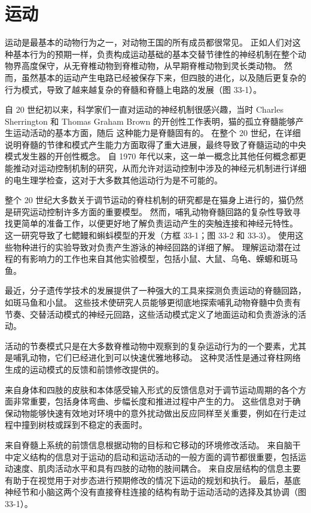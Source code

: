 \chapter{运动} \label{chap:chap33}

运动是最基本的动物行为之一，对动物王国的所有成员都很常见。 正如人们对这种基本行为的预期一样，负责构成运动基础的基本交替节律性的神经机制在整个动物界高度保守，从无脊椎动物到脊椎动物，从早期脊椎动物到灵长类动物。 然而，虽然基本的运动产生电路已经被保存下来，但四肢的进化，以及随后更复杂的行为模式，导致了越来越复杂的脊髓和脊髓上电路的发展（图 33-1）。

自 20 世纪初以来，科学家们一直对运动的神经机制很感兴趣，当时 Charles Sherrington 和 Thomas Graham Brown 的开创性工作表明，猫的孤立脊髓能够产生运动活动的基本方面，随后 这种能力是脊髓固有的。 在整个 20 世纪，在详细说明脊髓的节律和模式产生能力方面取得了重大进展，最终导致了脊髓运动的中央模式发生器的开创性概念。 自 1970 年代以来，这一单一概念比其他任何概念都更能推动对运动控制机制的研究，从而允许对运动控制中涉及的神经元机制进行详细的电生理学检查，这对于大多数其他运动行为是不可能的。

整个 20 世纪大多数关于调节运动的脊柱机制的研究都是在猫身上进行的，猫仍然是研究运动控制许多方面的重要模型。 然而，哺乳动物脊髓回路的复杂性导致寻找更简单的准备工作，以便更好地了解负责运动产生的突触连接和神经元特性。 这一研究导致了七鳃鳗和蝌蚪模型的开发（方框 33-1；图 33-2 和 33-3）。 使用这些物种进行的实验导致对负责产生游泳的神经回路的详细了解。 理解运动潜在过程的有影响力的工作也来自其他实验模型，包括小鼠、大鼠、乌龟、蝾螈和斑马鱼。

最近，分子遗传学技术的发展提供了一种强大的工具来探测负责运动的脊髓回路，如斑马鱼和小鼠。 这些技术使研究人员能够更彻底地探索哺乳动物脊髓中负责有节奏、交替活动模式的神经元回路，这些活动模式定义了地面运动和负责游泳的活动。

活动的节奏模式只是在大多数脊椎动物中观察到的复杂运动行为的一个要素，尤其是哺乳动物，它们已经进化到可以快速优雅地移动。 这种灵活性是通过脊柱网络生成的运动模式的反馈和前馈修改提供的。

来自身体和四肢的皮肤和本体感受输入形式的反馈信息对于调节运动周期的各个方面非常重要，包括身体弯曲、步幅长度和推进过程中产生的力。 这些信息对于确保动物能够快速有效地对环境中的意外扰动做出反应同样至关重要，例如在行走过程中撞到树枝或踩到不稳定的表面时。

来自脊髓上系统的前馈信息根据动物的目标和它移动的环境修改活动。 来自脑干中定义结构的信息对于运动的启动和运动活动的一般方面的调节都很重要，包括运动速度、肌肉活动水平和具有四肢的动物的肢间耦合。 来自皮层结构的信息主要有助于在视觉用于对步态进行预期修改的情况下运动的规划和执行。 最后，基底神经节和小脑这两个没有直接脊柱连接的结构有助于运动活动的选择及其协调（图 33-1）。

